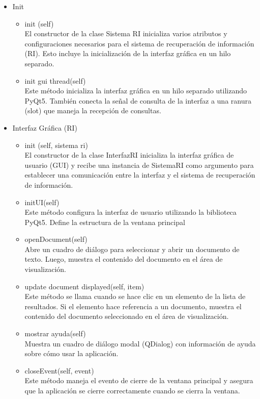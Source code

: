 \begin{itemize}
  \item Init 
  \begin{itemize}
    \item init (self) \\ El constructor de la clase Sistema RI inicializa varios atributos y configuraciones necesarios para el sistema de recuperación de información (RI). Esto incluye la inicialización de la interfaz gráfica en un hilo separado.
    \item init gui thread(self) \\ Este método inicializa la interfaz gráfica en un hilo separado utilizando PyQt5. También conecta la señal de consulta de la interfaz a una ranura (slot) que maneja la recepción de consultas.
  \end{itemize}
  \item Interfaz Gráfica (RI) 
  \begin{itemize}
    \item init (self, sistema ri) \\ El constructor de la clase InterfazRI inicializa la interfaz gráfica de usuario (GUI) y recibe una instancia de SistemaRI como argumento para establecer una comunicación entre la interfaz y el sistema de recuperación de información.
    \item initUI(self) \\ Este método configura la interfaz de usuario utilizando la biblioteca PyQt5. Define la estructura de la ventana principal
    \item openDocument(self) \\ Abre un cuadro de diálogo para seleccionar y abrir un documento de texto. Luego, muestra el contenido del documento en el área de visualización.
    \item update document displayed(self, item) \\ Este método se llama cuando se hace clic en un elemento de la lista de resultados. Si el elemento hace referencia a un documento, muestra el contenido del documento seleccionado en el área de visualización.
    \item mostrar ayuda(self) \\ Muestra un cuadro de diálogo modal (QDialog) con información de ayuda sobre cómo usar la aplicación.
    \item closeEvent(self, event) \\ Este método maneja el evento de cierre de la ventana principal y asegura que la aplicación se cierre correctamente cuando se cierra la ventana.

\end{itemize}
\end{itemize}
